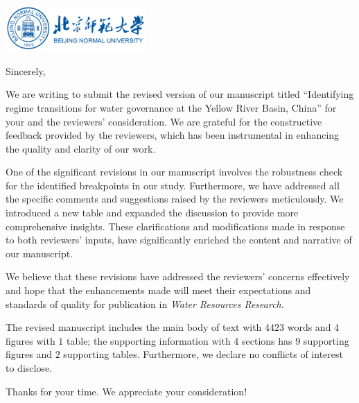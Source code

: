 \documentclass[11pt,a4paper,roman]{moderncv}
\begin{document}
\begin{minipage}[t]{\textwidth}
\includegraphics[width=0.40\textwidth]{bnu}
\end{minipage}


\opening{\vspace*{-2em}}
\closing{Sincerely,}{\vspace*{-2em}}
\makelettertitle
\justify

We are writing to submit the revised version of our manuscript titled ``Identifying regime transitions for water governance at the Yellow River Basin, China'' for your and the reviewers’ consideration. We are grateful for the constructive feedback provided by the reviewers, which has been instrumental in enhancing the quality and clarity of our work.

One of the significant revisions in our manuscript involves the robustness check for the identified breakpoints in our study. Furthermore, we have addressed all the specific comments and suggestions raised by the reviewers meticulously. We introduced a new table and expanded the discussion to provide more comprehensive insights. These clarifications and modifications made in response to both reviewers’ inputs, have significantly enriched the content and narrative of our manuscript.

We believe that these revisions have addressed the reviewers’ concerns effectively and hope that the enhancements made will meet their expectations and standards of quality for publication in \textit{Water Resources Research}.

The revised manuscript includes the main body of text with $4423$ words and $4$ figures with $1$ table; the supporting information with $4$ sections has $9$ supporting figures and $2$ supporting tables. Furthermore, we declare no conflicts of interest to disclose.

\vspace{0.3cm}

Thanks for your time. We appreciate your consideration!
\end{document}
